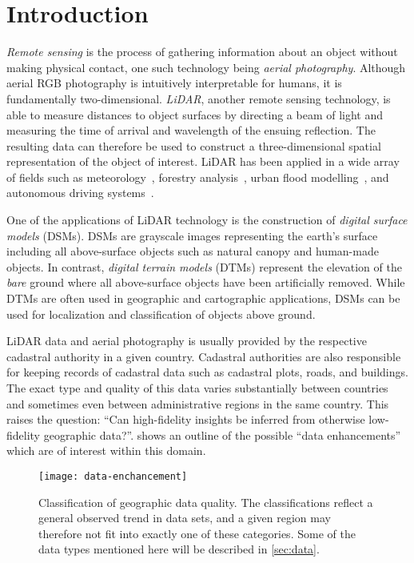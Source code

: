 \chapter{Introduction}%
\label{sec:introduction}

\textit{Remote sensing} is the process of gathering information about an object without making physical contact, one such technology being \textit{aerial photography}.
Although aerial RGB photography is intuitively interpretable for humans, it is fundamentally two-dimensional.
\textit{LiDAR}, another remote sensing technology, is able to measure distances to object surfaces by directing a beam of light and measuring the time of arrival and wavelength of the ensuing reflection.
The resulting data can therefore be used to construct a three-dimensional spatial representation of the object of interest.
LiDAR has been applied in a wide array of fields such as meteorology~\cite{lidar_meteorology_1966}, forestry analysis~\cite{lidar_forestry_2000}, urban flood modelling~\cite{lidar_flood_2013}, and autonomous driving systems~\cite{lidar_self_driving_2018}.

One of the applications of LiDAR technology is the construction of \textit{digital surface models} (DSMs).
DSMs are grayscale images representing the earth's surface including all above-surface objects such as natural canopy and human-made objects.
In contrast, \textit{digital terrain models} (DTMs) represent the elevation of the \textit{bare} ground where all above-surface objects have been artificially removed.
While DTMs are often used in geographic and cartographic applications, DSMs can be used for localization and classification of objects above ground.

LiDAR data and aerial photography is usually provided by the respective cadastral authority in a given country.
Cadastral authorities are also responsible for keeping records of cadastral data such as cadastral plots, roads, and buildings.
The exact type and quality of this data varies substantially between countries and sometimes even between administrative regions in the same country.
This raises the question: \enquote{Can high-fidelity insights be inferred from otherwise low-fidelity geographic data?}.
 shows an outline of the possible \enquote{data enhancements} which are of interest within this domain. %

\begin{figure}
  \texttt{[image: data-enchancement]}
  \caption{
    Classification of geographic data quality.
    The classifications reflect a general observed trend in data sets, and a given region may therefore not fit into exactly one of these categories.
    Some of the data types mentioned here will be described in \cref{sec:data}.
  }%
  \label{fig:data-enchancement}
\end{figure}

